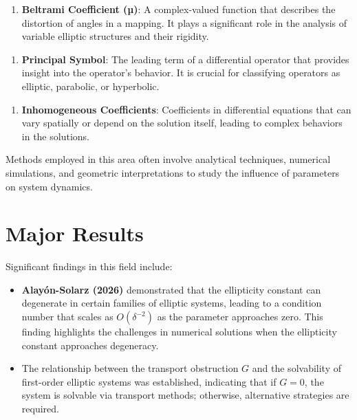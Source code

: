 \documentclass[11pt,a4paper]{article}
\begin{document}
\begin{enumerate}
\item \textbf{Beltrami Coefficient (µ)}: A complex-valued function that describes the distortion of angles in a mapping. It plays a significant role in the analysis of variable elliptic structures and their rigidity.
\end{enumerate}

\begin{enumerate}
\item \textbf{Principal Symbol}: The leading term of a differential operator that provides insight into the operator's behavior. It is crucial for classifying operators as elliptic, parabolic, or hyperbolic.
\end{enumerate}

\begin{enumerate}
\item \textbf{Inhomogeneous Coefficients}: Coefficients in differential equations that can vary spatially or depend on the solution itself, leading to complex behaviors in the solutions.
\end{enumerate}

Methods employed in this area often involve analytical techniques, numerical simulations, and geometric interpretations to study the influence of parameters on system dynamics.

\section{Major Results}
Significant findings in this field include:

\begin{itemize}
\item \textbf{Alayón-Solarz (2026)} demonstrated that the ellipticity constant can degenerate in certain families of elliptic systems, leading to a condition number that scales as \( O(\delta^{-2}) \) as the parameter approaches zero. This finding highlights the challenges in numerical solutions when the ellipticity constant approaches degeneracy.
\end{itemize}

\begin{itemize}
\item The relationship between the transport obstruction \( G \) and the solvability of first-order elliptic systems was established, indicating that if \( G = 0 \), the system is solvable via transport methods; otherwise, alternative strategies are required.
\end{itemize}
\end{document}
